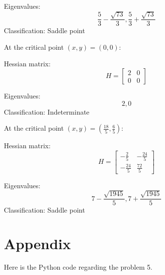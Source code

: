 \documentclass{article} %
\begin{document}
{    Eigenvalues:
    \[
    \frac{5}{3} - \frac{\sqrt{73}}{3}, \frac{5}{3} + \frac{\sqrt{73}}{3}
    \]
    Classification: 	Saddle point\
    \bigskip

    At the critical point $(x, y) = (0, 0)$:

    Hessian matrix:
    \[
    H = \left[\begin{matrix}2 & 0\\0 & 0\end{matrix}\right]
    \]

    Eigenvalues:
    \[
    2, 0
    \]
    Classification: 	Indeterminate\
    \bigskip

    At the critical point $(x, y) = (\frac{18}{5}, \frac{6}{5})$:

    Hessian matrix:
    \[
    H = \left[\begin{matrix}- \frac{2}{5} & - \frac{24}{5}\\- \frac{24}{5} & \frac{72}{5}\end{matrix}\right]
    \]

    Eigenvalues:
    \[
    7 - \frac{\sqrt{1945}}{5}, 7 + \frac{\sqrt{1945}}{5}
    \]
    Classification: 	Saddle point\
    \bigskip

}   

\clearpage
\section*{Appendix}
Here is the Python code regarding the problem 5.
\end{document}

